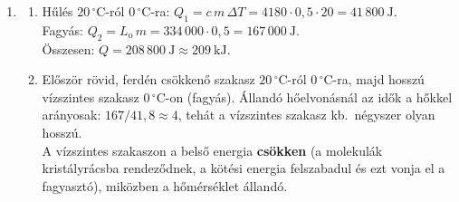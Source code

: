 \documentclass[11pt,a4paper]{article}
\begin{document}
\begin{enumerate}
\begin{enumerate}
\begin{minipage}[t]{0.40\linewidth}
\\
      {\small szaggatott: $C\to A$ (szorgalmi)}
      \end{minipage}
    \item Az óramutatóval ellentétes körüljárásnál \textbf{hűtőgép / hőszivattyú} lesz
      belőle. Ciklusonként $W = +150~\text{J}$ munkát kell befektetni (minden szakaszon
      megfordul $Q$, $W$, $\Delta E$ előjele).
  \end{enumerate}

\item
  \begin{enumerate}
    \item Hűlés $20\,^\circ$C-ról $0\,^\circ$C-ra:
      $Q_1 = c\,m\,\Delta T = 4180\cdot 0{,}5\cdot 20 = 41\,800~\text{J}$.\\
      Fagyás: $Q_2 = L_\text{o}\,m = 334\,000\cdot 0{,}5 = 167\,000~\text{J}$.\\
      Összesen: $Q = 208\,800~\text{J} \approx 209~\text{kJ}$.
    \item
      \begin{minipage}[t]{0.58\linewidth}
      Először rövid, ferdén csökkenő szakasz $20\,^\circ$C-ról $0\,^\circ$C-ra, majd hosszú
      vízszintes szakasz $0\,^\circ$C-on (fagyás). Állandó hőelvonásnál az idők a hőkkel
      arányosak: $167/41{,}8 \approx 4$, tehát a vízszintes szakasz kb.\ négyszer olyan
      hosszú.\\
      A vízszintes szakaszon a belső energia \textbf{csökken} (a molekulák kristályrácsba
      rendeződnek, a kötési energia felszabadul és ezt vonja el a fagyasztó), miközben a
      hőmérséklet állandó.
      \end{minipage}\hfill
      \begin{minipage}[t]{0.38\linewidth}\vspace{0pt}\centering
\end{minipage}
\end{enumerate}
\end{enumerate}
\end{document}
